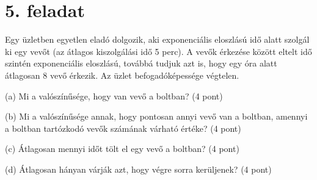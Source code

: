 \documentclass[a4paper,12pt]{article}   		%
\begin{document}
\pagebreak
\section*{5. feladat}
Egy üzletben egyetlen eladó dolgozik, aki exponenciális eloszlású idő 
alatt szolgál ki egy vevőt (az átlagos kiszolgálási idő 5 perc). A vevők
érkezése között eltelt idő  szintén exponenciális eloszlású, továbbá 
tudjuk azt is, hogy egy óra alatt átlagosan 8 vevő érkezik. Az üzlet 
befogadóképessége végtelen.

(a) Mi a valószínűsége, hogy van vevő a boltban? (4 pont)

(b) Mi a valószínűsége annak, hogy pontosan annyi vevő van a boltban, 
amennyi a boltban tartózkodó vevők számának várható értéke? (4 pont)

(c) Átlagosan mennyi időt tölt el egy vevő a boltban? (4 pont)

(d) Átlagosan hányan várják azt, hogy végre sorra kerüljenek? (4 pont)
\end{document}
